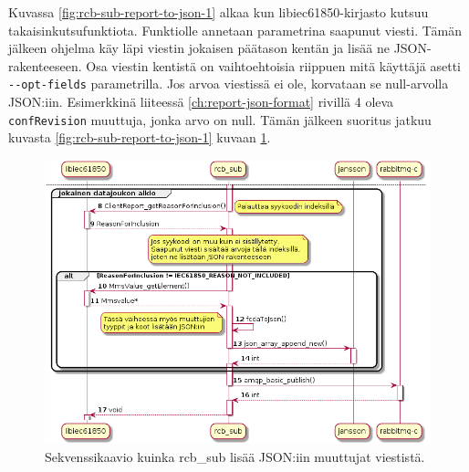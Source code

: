 Kuvassa \ref{fig:rcb-sub-report-to-json-1} alkaa kun libiec61850-kirjasto kutsuu takaisinkutsufunktiota. Funktiolle annetaan parametrina saapunut viesti. Tämän jälkeen ohjelma käy läpi viestin jokaisen päätason kentän ja lisää ne JSON-rakenteeseen. Osa viestin kentistä on vaihtoehtoisia riippuen mitä käyttäjä asetti \texttt{-{}-opt-fields} parametrilla. Jos arvoa viestissä ei ole, korvataan se null-arvolla JSON:iin. Esimerkkinä liiteessä \ref{ch:report-json-format} rivillä 4 oleva \texttt{confRevision} muuttuja, jonka arvo on null. Tämän jälkeen suoritus jatkuu kuvasta \ref{fig:rcb-sub-report-to-json-1} kuvaan \ref{fig:rcb-sub-report-to-json-2}.

\begin{figure}[ht!]
	\includegraphics[width=1\textwidth]{pictures/rcb-sub-report-to-json_001.png}
	\caption{Sekvenssikaavio kuinka rcb\_sub lisää JSON:iin muuttujat viestistä.}
	\label{fig:rcb-sub-report-to-json-2}
\end{figure}

